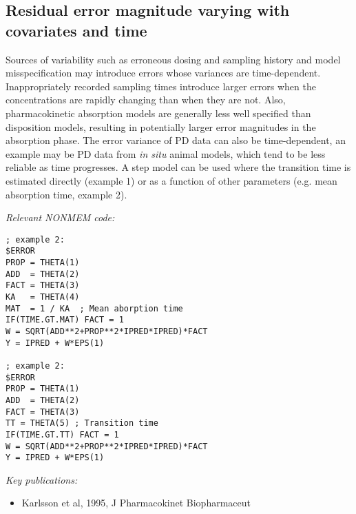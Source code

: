 \documentclass[a4paper,11pt]{article}
\begin{document}
\subsection{Residual error magnitude varying with covariates and time}

Sources of variability such as erroneous dosing and sampling history
and model misspecification may introduce errors whose variances are
time-dependent. Inappropriately recorded sampling times introduce
larger errors when the concentrations are rapidly changing than when
they are not. Also, pharmacokinetic absorption models are generally
less well specified than disposition models, resulting in potentially
larger error magnitudes in the absorption phase. The error variance of
PD data can also be time-dependent, an example may be PD data from
\textit{in situ} animal models, which tend to be less reliable as time
progresses. A step model can be used where the transition time is
estimated directly (example 1) or as a function of other parameters
(e.g. mean absorption time, example 2).

\vspace{10pt}

\noindent \emph{Relevant NONMEM code:}
\begin{lstlisting}
; example 2:
$ERROR
PROP = THETA(1)
ADD  = THETA(2)
FACT = THETA(3)
KA   = THETA(4) 
MAT  = 1 / KA  ; Mean aborption time
IF(TIME.GT.MAT) FACT = 1
W = SQRT(ADD**2+PROP**2*IPRED*IPRED)*FACT
Y = IPRED + W*EPS(1)

; example 2:
$ERROR
PROP = THETA(1)
ADD  = THETA(2)
FACT = THETA(3)
TT = THETA(5) ; Transition time
IF(TIME.GT.TT) FACT = 1
W = SQRT(ADD**2+PROP**2*IPRED*IPRED)*FACT
Y = IPRED + W*EPS(1)
\end{lstlisting}

\noindent \emph{Key publications:}
\begin{itemize}
\item Karlsson et al, 1995, J Pharmacokinet Biopharmaceut
\end{itemize}
\end{document}
